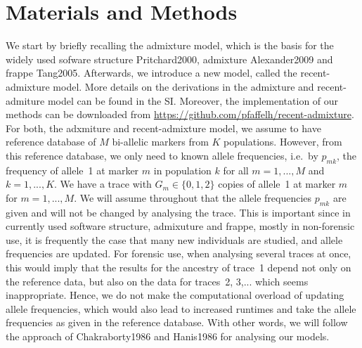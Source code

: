 \documentclass[12pt]{article}
\theoremstyle{definition}
\begin{document}
\section{Materials and Methods}
We start by briefly recalling the admixture model, which is the basis
for the widely used sofware {\sc structure} \cite{article}{Pritchard2000}, {\sc
  admixture} \cite{article}{Alexander2009} and {\sc frappe} \cite{article}{Tang2005}.
Afterwards, we introduce a new model, called the recent-admixture
model. More details on the derivations in the admixture and
recent-admiture model can be found in the SI. Moreover, the
implementation of our methods can be downloaded from \url{
  https://github.com/pfaffelh/recent-admixture}. For both, the
adxmiture and recent-admixture model, we assume to have reference
database of $M$ bi-allelic markers from $K$ populations. However, from
this reference database, we only need to known allele frequencies,
i.e.\ by $p_{mk}$, the frequency of allele~1 at marker $m$ in
population $k$ for all $m=1,...,M$ and $k=1,...,K$. We have a trace
with $G_m \in \{0,1,2\}$ copies of allele~1 at marker $m$ for
$m=1,...,M$.  We will assume throughout that the allele frequencies
$p_{mk}$ are given and will not be changed by analysing the
trace. This is important since in currently used software {\sc
  structure}, {\sc admixuture} and {\sc frappe}, mostly in
non-forensic use, it is frequently the case that many new individuals
are studied, and allele frequencies are updated. For forensic use,
when analysing several traces at once, this would imply that the
results for the ancestry of trace~1 depend not only on the reference
data, but also on the data for traces~2, 3,... which seems
inappropriate. Hence, we do not make the computational overload of
updating allele frequencies, which would also lead to increased
runtimes and take the allele frequencies as given in the reference
database. With other words, we will follow the approach of
\cite{article}{Chakraborty1986} and \cite{article}{Hanis1986} for analysing our models.
\end{document}
